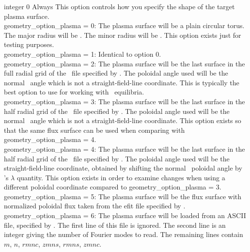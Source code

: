 {integer}
{0}
{Always}
{This option controls how you specify the shape of the target plasma surface.\\

{\ttfamily geometry\_option\_plasma} = 0: The plasma surface will be a plain circular torus. The major radius will be .
     The minor radius will be . This option exists just for testing purposes.\\

{\ttfamily geometry\_option\_plasma} = 1: Identical to option 0.\\

{\ttfamily geometry\_option\_plasma} = 2: The plasma surface will be the last surface in the full radial grid of the \vmec~file specified by .
The poloidal angle used will be the normal \vmec~angle which is not a straight-field-line coordinate.
This is typically the best option to use for working with \vmec~equilibria.\\

{\ttfamily geometry\_option\_plasma} = 3: The plasma surface will be the last surface in the half radial grid of the \vmec~file specified by .
The poloidal angle used will be the normal \vmec~angle which is not a straight-field-line coordinate.
This option exists so that the same flux surface can be used when comparing with {\ttfamily geometry\_option\_plasma} = 4.\\

{\ttfamily geometry\_option\_plasma} = 4: The plasma surface will be the last surface in the half radial grid of the \vmec~file specified by .
The poloidal angle used will be the straight-field-line coordinate, obtained by shifting the normal \vmec~poloidal angle by \vmec's $\lambda$ quantity.
This option exists in order to examine changes when using a different poloidal coordinate compared to {\ttfamily geometry\_option\_plasma} = 3.\\

{\ttfamily geometry\_option\_plasma} = 5: The plasma surface will be the flux surface with normalized poloidal flux
 taken from the {\ttfamily efit} file specified by . \\

{\ttfamily geometry\_option\_plasma} = 6: The plasma surface will be loaded from an ASCII file, specified by . The first line of this file is ignored. The second line is an integer giving the number of Fourier modes
to read. The remaining lines contain $m$, $n$, $rmnc$, $zmns$, $rmns$, $zmnc$. \\

}
